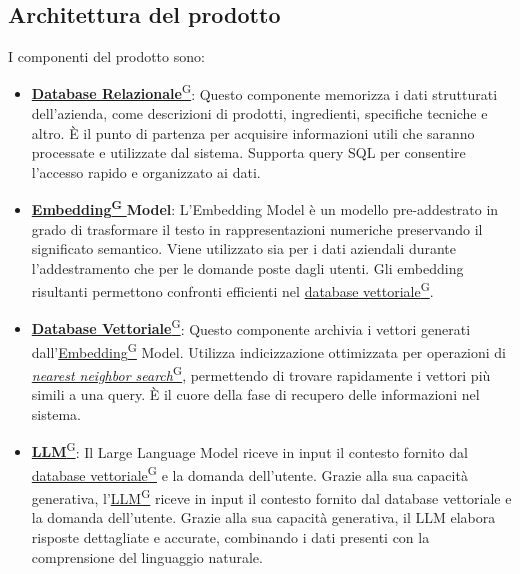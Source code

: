 \subsection{Architettura del prodotto}
I componenti del prodotto sono:
\begin{itemize}
    \item \href{https://code7crusaders.github.io/docs/RTB/documentazione_interna/glossario.html#database-relazionale}{\textbf{Database Relazionale}\textsuperscript{G}}:  
    Questo componente memorizza i dati strutturati dell’azienda, come descrizioni di prodotti, ingredienti, specifiche tecniche e altro. È il punto di partenza per acquisire informazioni utili che saranno processate e utilizzate dal sistema. Supporta query SQL per consentire l'accesso rapido e organizzato ai dati.
    
    \item \href{https://code7crusaders.github.io/docs/RTB/documentazione_interna/glossario.html#embedding}{\textbf{Embedding\textsuperscript{G}} } \textbf{Model}:  
    L’Embedding Model è un modello pre-addestrato in grado di trasformare il testo in rappresentazioni numeriche preservando il significato semantico. Viene utilizzato sia per i dati aziendali durante l’addestramento che per le domande poste dagli utenti. Gli embedding risultanti permettono confronti efficienti nel \href{https://code7crusaders.github.io/docs/RTB/documentazione_interna/glossario.html#database-vettoriale}{database vettoriale\textsuperscript{G}}.
    
    \item \href{https://code7crusaders.github.io/docs/RTB/documentazione_interna/glossario.html#database-vettoriale}{\textbf{Database Vettoriale}\textsuperscript{G}}:  
    Questo componente archivia i vettori generati dall’\href{https://code7crusaders.github.io/docs/RTB/documentazione_interna/glossario.html#embedding}{Embedding\textsuperscript{G}} Model. Utilizza indicizzazione ottimizzata per operazioni di \href{https://code7crusaders.github.io/docs/RTB/documentazione_interna/glossario.html#nearest-neighbor-search-nns}{\textit{nearest neighbor search}\textsuperscript{G}}, permettendo di trovare rapidamente i vettori più simili a una query. È il cuore della fase di recupero delle informazioni nel sistema.
    
    \item \href{https://code7crusaders.github.io/docs/RTB/documentazione_interna/glossario.html#llm-large-language-model}{\textbf{LLM}\textsuperscript{G}}:  
    Il Large Language Model riceve in input il contesto fornito dal \href{https://code7crusaders.github.io/docs/RTB/documentazione_interna/glossario.html#database-vettoriale}{database vettoriale\textsuperscript{G}} e la domanda dell’utente. Grazie alla sua capacità generativa, l'\href{https://code7crusaders.github.io/docs/RTB/documentazione_interna/glossario.html#llm-large-language-model}{LLM\textsuperscript{G}} riceve in input il contesto fornito dal database vettoriale e la domanda dell’utente. Grazie alla sua capacità generativa, il LLM elabora risposte dettagliate e accurate, combinando i dati presenti con la comprensione del linguaggio naturale.
    

\end{itemize}
